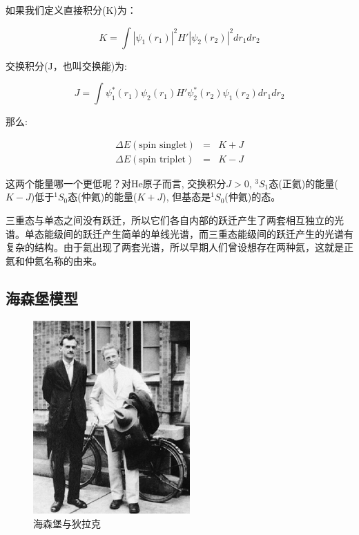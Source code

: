 如果我们定义直接积分(K)为：

\begin{equation*}
K = \int |\psi_1(r_1)|^2H'|\psi_2(r_2)|^2dr_1dr_2
\end{equation*}

交换积分(J，也叫交换能)为:

\begin{equation*}
J = \int \psi_1^*(r_1)\psi_2(r_1) H'\psi_2^*(r_2)\psi_1(r_2)
dr_1dr_2
\end{equation*}

那么:

\begin{eqnarray*}
  \Delta E(\text{spin singlet}) &=& K+J \\
  \Delta E(\text{spin triplet}) &=& K-J
\end{eqnarray*}


这两个能量哪一个更低呢？对He原子而言, 交换积分$J > 0$,
${}^3S_1$态(正氦)的能量($ K - J $)低于${}^1S_0$态(仲氦)的能量($ K + J$),
但基态是${}^1S_0$(仲氦)的态。


三重态与单态之间没有跃迁，所以它们各自内部的跃迁产生了两套相互独立的光谱。单态能级间的跃迁产生简单的单线光谱，而三重态能级间的跃迁产生的光谱有复杂的结构。由于氦出现了两套光谱，所以早期人们曾设想存在两种氦，这就是正氦和仲氦名称的由来。

\subsection{海森堡模型}

\begin{figure}[h]
\begin{center}
\includegraphics[clip,width=6cm]{IdenticalParticles/heisenberg-dirac.ps}
\caption{海森堡与狄拉克}
\end{center}
\end{figure}

